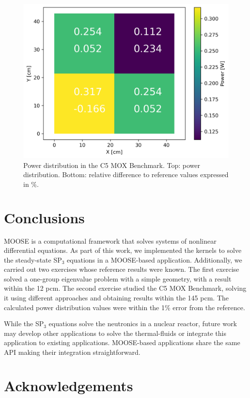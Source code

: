 \documentclass{anstrans}
\begin{document}
\begin{figure}[htbp!] %
    \centering
    \includegraphics[width=0.95\linewidth]{figures/distrib.png}
    \hfill
    \caption{Power distribution in the C5 MOX Benchmark. Top: power distribution. Bottom: relative difference to reference values expressed in \%.}
    \label{fig:power-distrib}
\end{figure}


\section{Conclusions}

MOOSE is a computational framework that solves systems of nonlinear differential equations.
As part of this work, we implemented the kernels to solve the steady-state SP$_3$ equations in a MOOSE-based application.
Additionally, we carried out two exercises whose reference results were known.
The first exercise solved a one-group eigenvalue problem with a simple geometry, with a result within the 12 pcm.
The second exercise studied the C5 MOX Benchmark, solving it using different approaches and obtaining results within the 145 pcm.
The calculated power distribution values were within the 1\% error from the reference.

While the SP$_3$ equations solve the neutronics in a nuclear reactor, future work may develop other applications to solve the thermal-fluids or integrate this application to existing applications.
MOOSE-based applications share the same API making their integration straightforward.


\section{Acknowledgements}
\end{document}
